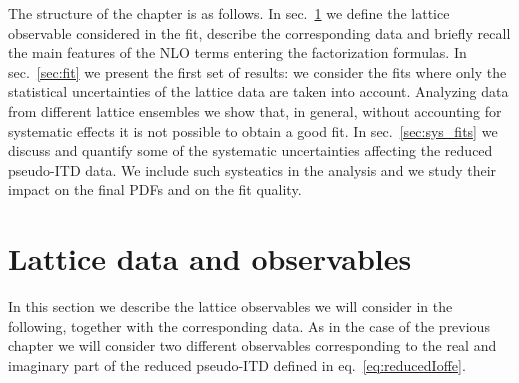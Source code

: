 The structure of the chapter is as  follows.  In sec.~\ref{sec:data} we define the lattice observable considered in the fit,
describe the corresponding data and  briefly recall the main features of the NLO terms entering the factorization formulas.
In sec.~\ref{sec:fit} we present the first set of results:
we consider the  fits where only the statistical uncertainties of the lattice data are taken into account.
Analyzing data from different lattice ensembles we 
show that, in general, without accounting for systematic effects  it is not possible to obtain a good fit.
In sec.~\ref{sec:sys_fits} we discuss and quantify some of the systematic uncertainties affecting
the reduced pseudo-ITD data.  We include such systeatics in the analysis and we study their impact on the final PDFs
and on the fit quality.


\section{Lattice data and observables}
\label{sec:data}

In this section we describe the lattice observables we will consider in the following, together with the corresponding data.
As in the case of the previous chapter we will consider two different observables corresponding to 
the real and imaginary part of the reduced pseudo-ITD defined in eq.~\eqref{eq:reducedIoffe}.
 
